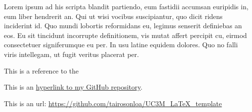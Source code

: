 \documentclass[10pt, english, pdftex]{template/UC3M_document}
\begin{document}
Lorem ipsum ad his scripta blandit partiendo, eum fastidii accumsan euripidis in, eum liber hendrerit an. Qui ut wisi vocibus suscipiantur,
quo dicit ridens inciderint id. Quo mundi lobortis reformidans eu, legimus senserit definiebas an eos. Eu sit tincidunt incorrupte definitionem,
vis mutat affert percipit cu, eirmod consectetuer signiferumque eu per. In usu latine equidem dolores. Quo no falli viris intellegam, ut fugit
veritus placerat per.

This is a reference to the 

This is an \href{https://github.com/tairosonloa/UC3M_LaTeX_template}{hyperlink to my GitHub repository}.

This is an url: \url{https://github.com/tairosonloa/UC3M_LaTeX_template}
\end{document}
